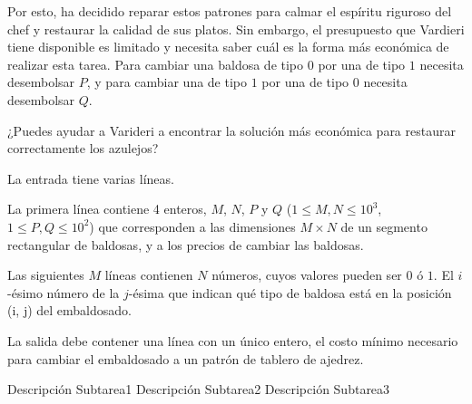 \documentclass{oci}
\begin{document}
\begin{problemDescription}
Por esto, ha decidido reparar estos patrones para calmar el espíritu riguroso del chef y restaurar la calidad de sus platos.
Sin embargo, el presupuesto que Vardieri tiene disponible es limitado y necesita saber cuál es la forma más económica de realizar esta tarea.
Para cambiar una baldosa de tipo $0$ por una de tipo $1$ necesita desembolsar $P$, y para cambiar una de tipo $1$ por una de tipo $0$ necesita desembolsar $Q$.

¿Puedes ayudar a Varideri a encontrar la solución más económica para restaurar correctamente los azulejos?

\end{problemDescription}

\begin{inputDescription}
La entrada tiene varias líneas.

La primera línea contiene 4 enteros, $M$, $N$, $P$ y $Q$ ($1 \le M, N \le 10^3$, $1 \le P, Q \le 10^2$) que corresponden a las dimensiones $M \times N$ de un segmento rectangular de baldosas, y a los precios de cambiar las baldosas.

Las siguientes $M$ líneas contienen $N$ números, cuyos valores pueden ser $0$ ó $1$.
El $i$-ésimo número de la $j$-ésima que indican qué tipo de baldosa está en la posición (i, j) del embaldosado.
\end{inputDescription}

\begin{outputDescription}
La salida debe contener una línea con un único entero, el costo mínimo necesario para cambiar el embaldosado a un patrón de tablero de ajedrez.
\end{outputDescription}

\begin{scoreDescription}
  Descripción Subtarea1
  Descripción Subtarea2
  Descripción Subtarea3
\end{scoreDescription}

\begin{sampleDescription}
\end{sampleDescription}
\end{document}

